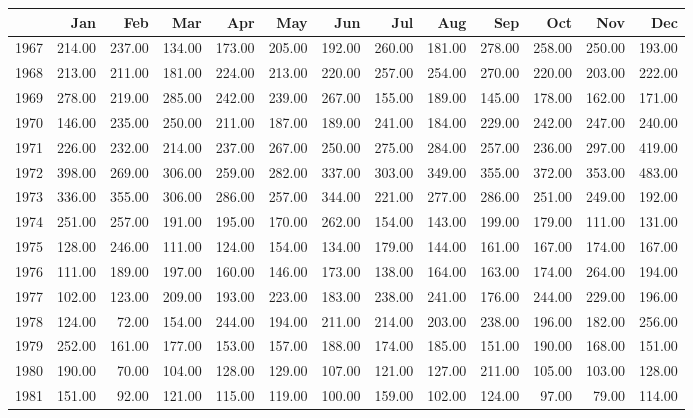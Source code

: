 \begin{longtable}{rrrrrrrrrrrrr}
  \hline
 & Jan & Feb & Mar & Apr & May & Jun & Jul & Aug & Sep & Oct & Nov & Dec \\ 
  \hline
1967 & 214.00 & 237.00 & 134.00 & 173.00 & 205.00 & 192.00 & 260.00 & 181.00 & 278.00 & 258.00 & 250.00 & 193.00 \\ 
  1968 & 213.00 & 211.00 & 181.00 & 224.00 & 213.00 & 220.00 & 257.00 & 254.00 & 270.00 & 220.00 & 203.00 & 222.00 \\ 
  1969 & 278.00 & 219.00 & 285.00 & 242.00 & 239.00 & 267.00 & 155.00 & 189.00 & 145.00 & 178.00 & 162.00 & 171.00 \\ 
  1970 & 146.00 & 235.00 & 250.00 & 211.00 & 187.00 & 189.00 & 241.00 & 184.00 & 229.00 & 242.00 & 247.00 & 240.00 \\ 
  1971 & 226.00 & 232.00 & 214.00 & 237.00 & 267.00 & 250.00 & 275.00 & 284.00 & 257.00 & 236.00 & 297.00 & 419.00 \\ 
  1972 & 398.00 & 269.00 & 306.00 & 259.00 & 282.00 & 337.00 & 303.00 & 349.00 & 355.00 & 372.00 & 353.00 & 483.00 \\ 
  1973 & 336.00 & 355.00 & 306.00 & 286.00 & 257.00 & 344.00 & 221.00 & 277.00 & 286.00 & 251.00 & 249.00 & 192.00 \\ 
  1974 & 251.00 & 257.00 & 191.00 & 195.00 & 170.00 & 262.00 & 154.00 & 143.00 & 199.00 & 179.00 & 111.00 & 131.00 \\ 
  1975 & 128.00 & 246.00 & 111.00 & 124.00 & 154.00 & 134.00 & 179.00 & 144.00 & 161.00 & 167.00 & 174.00 & 167.00 \\ 
  1976 & 111.00 & 189.00 & 197.00 & 160.00 & 146.00 & 173.00 & 138.00 & 164.00 & 163.00 & 174.00 & 264.00 & 194.00 \\ 
  1977 & 102.00 & 123.00 & 209.00 & 193.00 & 223.00 & 183.00 & 238.00 & 241.00 & 176.00 & 244.00 & 229.00 & 196.00 \\ 
  1978 & 124.00 & 72.00 & 154.00 & 244.00 & 194.00 & 211.00 & 214.00 & 203.00 & 238.00 & 196.00 & 182.00 & 256.00 \\ 
  1979 & 252.00 & 161.00 & 177.00 & 153.00 & 157.00 & 188.00 & 174.00 & 185.00 & 151.00 & 190.00 & 168.00 & 151.00 \\ 
  1980 & 190.00 & 70.00 & 104.00 & 128.00 & 129.00 & 107.00 & 121.00 & 127.00 & 211.00 & 105.00 & 103.00 & 128.00 \\ 
  1981 & 151.00 & 92.00 & 121.00 & 115.00 & 119.00 & 100.00 & 159.00 & 102.00 & 124.00 & 97.00 & 79.00 & 114.00 \\ 

\end{longtable}
